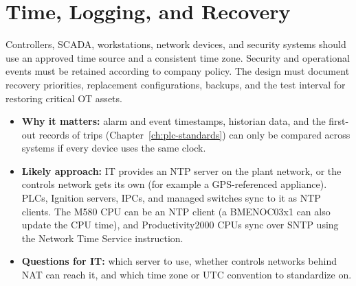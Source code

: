 \section{Time, Logging, and Recovery}
Controllers, SCADA, workstations, network devices, and security systems should use an approved time source and a consistent time zone. Security and operational events must be retained according to company policy. The design must document recovery priorities, replacement configurations, backups, and the test interval for restoring critical OT assets.

\begin{itemize}[itemsep=1pt]
  \item \textbf{Why it matters:} alarm and event timestamps, historian data, and the first-out records of trips (Chapter~\ref{ch:plc-standards}) can only be compared across systems if every device uses the same clock.
  \item \textbf{Likely approach:} IT provides an NTP server on the plant network, or the controls network gets its own (for example a GPS-referenced appliance). PLCs, Ignition servers, IPCs, and managed switches sync to it as NTP clients. The M580 CPU can be an NTP client (a BMENOC03x1 can also update the CPU time), and Productivity2000 CPUs sync over SNTP using the Network Time Service instruction.
  \item \textbf{Questions for IT:} which server to use, whether controls networks behind NAT can reach it, and which time zone or UTC convention to standardize on.
\end{itemize}
